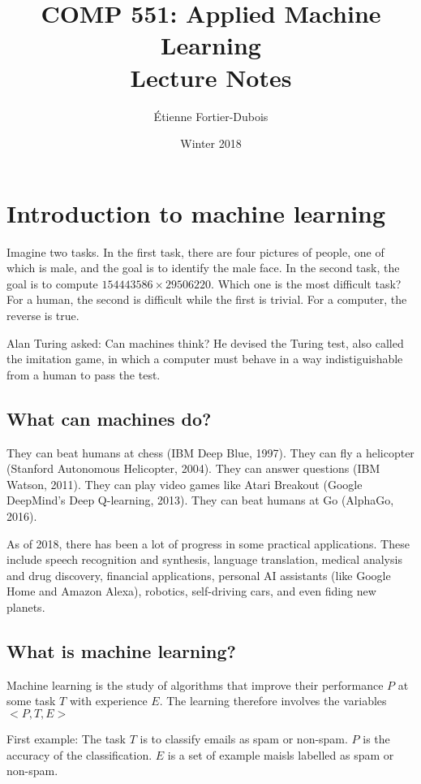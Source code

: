 \documentclass[a4paper,12pt]{article}
\title{COMP 551: Applied Machine Learning\\ \large Lecture Notes}
\author{Étienne Fortier-Dubois}
\date{Winter 2018}
\begin{document}
\maketitle
\frenchspacing

\tableofcontents
\newpage

\section{Introduction to machine learning}

Imagine two tasks. In the first task, there are four pictures of people, one of which is male, and the goal is to identify the male face. In the second task, the goal is to compute $154443586 \times 29506220$. Which one is the most difficult task? For a human, the second is difficult while the first is trivial. For a computer, the reverse is true. 

Alan Turing asked: Can machines think? He devised the Turing test, also called the imitation game, in which a computer must behave in a way indistiguishable from a human to pass the test. 

\subsection{What can machines do?}

They can beat humans at chess (IBM Deep Blue, 1997). They can fly a helicopter (Stanford Autonomous Helicopter, 2004). They can answer questions (IBM Watson, 2011). They can play video games like Atari Breakout (Google DeepMind's Deep Q-learning, 2013). They can beat humans at Go (AlphaGo, 2016). 

As of 2018, there has been a lot of progress in some practical applications. These include speech recognition and synthesis, language translation, medical analysis and drug discovery, financial applications, personal AI assistants (like Google Home and Amazon Alexa), robotics, self-driving cars, and even fiding new planets. 

\subsection{What is machine learning?}

Machine learning is the study of algorithms that improve their performance $P$ at some task $T$ with experience $E$. The learning therefore involves the variables $<P, T, E>$

First example: The task $T$ is to classify emails as spam or non-spam. $P$ is the accuracy of the classification. $E$ is a set of example maisls labelled as spam or non-spam. 
\end{document}
